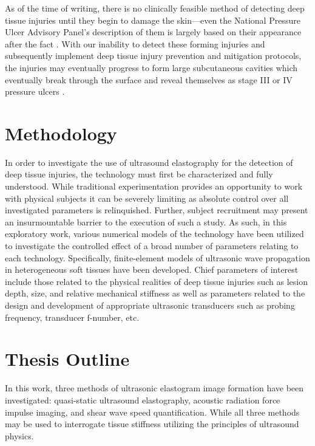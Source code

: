 \documentclass[12pt]{book}
\begin{document}
		As of the time of writing, there is no clinically feasible method of detecting deep tissue injuries until they begin to damage the skin---even the National Pressure Ulcer Advisory Panel's description of them is largely based on their appearance after the fact \cite{npuap07}. With our inability to detect these forming injuries and subsequently implement deep tissue injury prevention and mitigation protocols, the injuries may eventually progress to form large subcutaneous cavities which eventually break through the surface and reveal themselves as stage III or IV pressure ulcers \cite{bouten03,oomens10}. 

	\section{Methodology}
		In order to investigate the use of ultrasound elastography for the detection of deep tissue injuries, the technology must first be characterized and fully understood. While traditional experimentation provides an opportunity to work with physical subjects it can be severely limiting as absolute control over all investigated parameters is relinquished. Further, subject recruitment may present an insurmountable barrier to the execution of such a study. As such, in this exploratory work, various numerical models of the technology have been utilized to investigate the controlled effect of a broad number of parameters relating to each technology. Specifically, finite-element models of ultrasonic wave propagation in heterogeneous soft tissues have been developed.  Chief parameters of interest include those related to the physical realities of deep tissue injuries such as lesion depth, size, and relative mechanical stiffness as well as parameters related to the design and development of appropriate ultrasonic transducers such as probing frequency, transducer f-number, etc.

	\section{Thesis Outline}
		In this work, three methods of ultrasonic elastogram image formation have been investigated: quasi-static ultrasound elastography, acoustic radiation force impulse imaging, and shear wave speed quantification. While all three methods may be used to interrogate tissue stiffness utilizing the principles of ultrasound physics.
\end{document}
